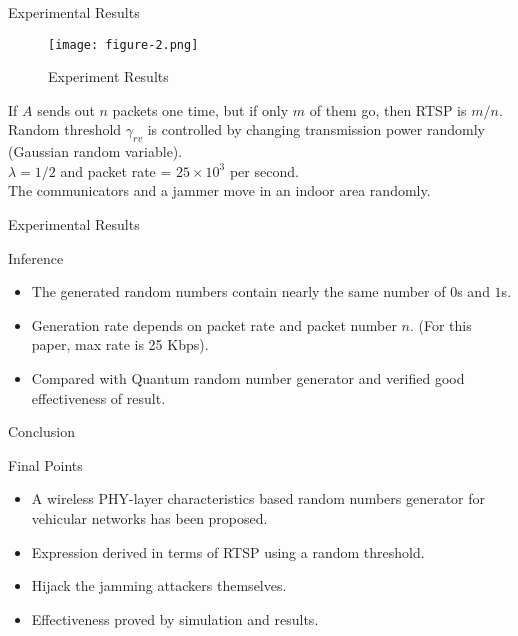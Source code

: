 \documentclass{beamer}
\begin{document}
\begin{frame}{Experimental Results}
     \begin{figure}[!htb]
        \centering
        \texttt{[image: figure-2.png]}
        \caption{Experiment Results}
        \label{fig:experiment}
    \end{figure}
    If $A$ sends out $n$ packets one time, but if only $m$ of them go, then RTSP is $m/n$. Random threshold $\gamma_{rv}$ is controlled by changing transmission power randomly (Gaussian random variable).\\
    $\lambda=1/2$ and packet rate = $25\times 10^3$ per second.\\
    The communicators and a jammer move in an indoor area randomly.
\end{frame}
\begin{frame}{Experimental Results}
    \begin{block}{Inference}
        \begin{itemize}
            \item The generated random numbers contain nearly the same number of $0$s and $1$s.
            \item Generation rate depends on packet rate and packet number $n$. (For this paper, max rate is 25 Kbps).
            \item Compared with Quantum random number generator and verified good effectiveness of result.
        \end{itemize}
    \end{block}
\end{frame}
\begin{frame}{Conclusion}
    \begin{block}{Final Points}
    \begin{itemize}
        \item A wireless PHY-layer characteristics based random numbers generator for vehicular networks has been proposed.
        \item Expression derived in terms of RTSP using a random threshold.
        \item Hijack the jamming attackers themselves.
        \item Effectiveness proved by simulation and results.
    \end{itemize}
    \end{block}
\end{frame}
\end{document}
